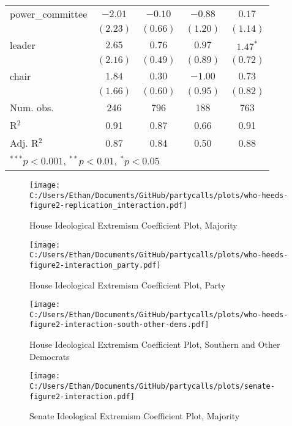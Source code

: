 \documentclass[12pt]{article}
\begin{document}
\begin{table}[H]
\begin{center}
\begin{tabular}{l c c c c }
			power\_committee              & $-2.01$       & $-0.10$      & $-0.88$   & $0.17$        \\
			& $(2.23)$      & $(0.66)$     & $(1.20)$  & $(1.14)$      \\
			leader                        & $2.65$        & $0.76$       & $0.97$    & $1.47^{*}$    \\
			& $(2.16)$      & $(0.49)$     & $(0.89)$  & $(0.72)$      \\
			chair                         & $1.84$        & $0.30$       & $-1.00$   & $0.73$        \\
			& $(1.66)$      & $(0.60)$     & $(0.95)$  & $(0.82)$      \\
			\hline
			Num. obs.                     & 246           & 796          & 188       & 763           \\
			R$^2$           & 0.91          & 0.87         & 0.66      & 0.91          \\
			Adj. R$^2$      & 0.87          & 0.84         & 0.50      & 0.88          \\
			\hline
			\multicolumn{5}{l}{\scriptsize{$^{***}p<0.001$, $^{**}p<0.01$, $^*p<0.05$}}
		\end{tabular}
	\end{center}
\end{table}

\begin{figure}[H]
	\centering
	\caption{House Ideological Extremism Coefficient Plot, Majority}
	\texttt{[image: C:/Users/Ethan/Documents/GitHub/partycalls/plots/who-heeds-figure2-replication\_interaction.pdf]}
\end{figure}

\begin{figure}[H]
	\centering
	\caption{House Ideological Extremism Coefficient Plot, Party}
	\texttt{[image: C:/Users/Ethan/Documents/GitHub/partycalls/plots/who-heeds-figure2-interaction\_party.pdf]}
\end{figure}

\begin{figure}[H]
	\centering
	\caption{House Ideological Extremism Coefficient Plot, Southern and Other Democrats}
	\texttt{[image: C:/Users/Ethan/Documents/GitHub/partycalls/plots/who-heeds-figure2-interaction-south-other-dems.pdf]}
\end{figure}

\begin{figure}[H]
	\centering
	\caption{Senate Ideological Extremism Coefficient Plot, Majority}
	\texttt{[image: C:/Users/Ethan/Documents/GitHub/partycalls/plots/senate-figure2-interaction.pdf]}
\end{figure}
\end{document}
